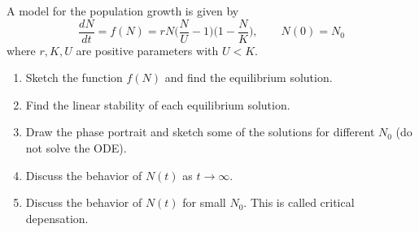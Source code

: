 \documentclass[12pt]{article}
\newenvironment{exercise}[2][Exercise]{\begin{trivlist}
\item[\hskip \labelsep {\bfseries #1}\hskip \labelsep {\bfseries #2.}]}{\end{trivlist}}
\begin{document}
\begin{exercise}{3}
A model for the population growth is given by 
$$\frac{dN}{dt} = f(N) = rN \bigg( \frac{N}{U} - 1 \bigg)\bigg( 1 - \frac{N}{K} \bigg), \qquad N(0) = N_0$$
where $r, K, U$ are positive parameters with $U < K$.

\begin{enumerate}
\item[a)] Sketch the function $f(N)$ and find the equilibrium solution.
\item[b)] Find the linear stability of each equilibrium solution.
\item[c)] Draw the phase portrait and sketch some of the solutions for different $N_0$ (do not solve the ODE).
\item[d)] Discuss the behavior of $N(t)$ as $t \rightarrow \infty$.
\item[e)] Discuss the behavior of $N(t)$ for small $N_0$. This is called critical depensation.
\end{enumerate}
\end{exercise}

 
\end{document}
